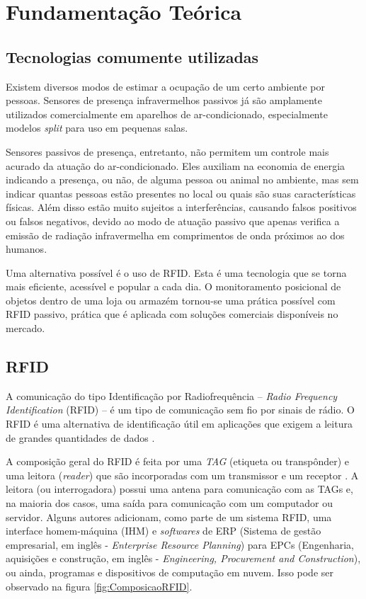 
\chapter{Fundamentação Teórica\label{chap:Fundamentacao}}


\section{Tecnologias comumente utilizadas}
 
 Existem diversos modos de estimar a ocupação de um certo ambiente por pessoas. Sensores de presença infravermelhos passivos já são amplamente utilizados comercialmente em aparelhos de ar-condicionado, especialmente modelos \textit{split} para uso em pequenas salas.
 
 Sensores passivos de presença, entretanto, não permitem um controle mais acurado da atuação do ar-condicionado. Eles auxiliam na economia de energia indicando a presença, ou não, de alguma pessoa ou animal no ambiente, mas sem indicar quantas pessoas estão presentes no local ou quais são suas características físicas. Além disso estão muito sujeitos a interferências, causando falsos positivos ou falsos negativos, devido ao modo de atuação passivo que apenas verifica a emissão de radiação infravermelha em comprimentos de onda próximos ao dos humanos.

 Uma alternativa possível é o uso de RFID. Esta é uma tecnologia que se torna mais eficiente, acessível e popular a cada dia. O monitoramento posicional de objetos dentro de uma loja ou armazém tornou-se uma prática possível com RFID passivo, prática que é aplicada com soluções comerciais disponíveis no mercado.
 
\section{RFID}

A comunicação do tipo Identificação por Radiofrequência – \textit{Radio Frequency Identification} (RFID) – é um tipo de comunicação sem fio por sinais de rádio. O RFID é uma alternativa de identificação útil em aplicações que exigem a leitura de grandes quantidades de dados \cite{rao1999overview}. 

A composição geral do RFID é feita por uma \textit{TAG} (etiqueta ou transpônder) e uma leitora (\textit{reader}) que são incorporadas com um transmissor e um receptor \cite{EPC-RFID-link}. A leitora (ou interrogadora) possui uma antena para comunicação com as TAGs e, na maioria dos casos, uma saída para comunicação com um computador ou servidor. Alguns autores adicionam, como parte de um sistema RFID, uma interface homem-máquina (IHM) e \textit{softwares} de ERP (Sistema de gestão empresarial, em inglês - \textit{Enterprise Resource Planning}) para EPCs (Engenharia, aquisições e construção, em inglês - \textit{Engineering, Procurement and Construction}), ou ainda, programas e dispositivos de computação em nuvem. Isso pode ser observado na figura \ref{fig:ComposicaoRFID}.

